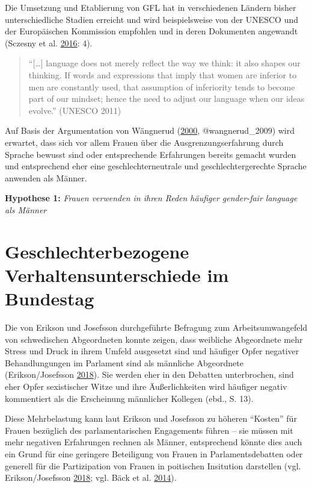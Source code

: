 \documentclass[12pt,ngerman,]{article}
\begin{document}
Die Umsetzung und Etablierung von GFL hat in verschiedenen Ländern
bisher unterschiedliche Stadien erreicht und wird beispielsweise von der
UNESCO und der Europäischen Kommission empfohlen und in deren Dokumenten
angewandt (Sczesny et al. \protect\hyperlink{ref-sczesny_2016}{2016}:
4).

\begin{quote}
\enquote{{[}\ldots{}{]} language does not merely reflect the way we
think: it also shapes our thinking. If words and expressions that imply
that women are inferior to men are constantly used, that assumption of
inferiority tends to become part of our mindset; hence the need to
adjust our language when our ideas evolve.} (UNESCO 2011)
\end{quote}

Auf Basis der Argumentation von Wängnerud
(\protect\hyperlink{ref-wangnerud_2000}{2000}, @wangnerud\_2009) wird
erwartet, dass sich vor allem Frauen über die Ausgrenzungserfahrung
durch Sprache bewusst sind oder entsprechende Erfahrungen bereits
gemacht wurden und entsprechend eher eine geschlechterneutrale und
geschlechtergerechte Sprache anwenden als Männer.

\textbf{Hypothese 1:} \emph{Frauen verwenden in ihren Reden häufiger
gender-fair language als Männer}

\hypertarget{geschlechterbezogene-verhaltensunterschiede-im-bundestag}{%
\section{Geschlechterbezogene Verhaltensunterschiede im
Bundestag}\label{geschlechterbezogene-verhaltensunterschiede-im-bundestag}}

Die von Erikson und Josefsson durchgeführte Befragung zum
Arbeitsumwangefeld von schwedischen Abgeordneten konnte zeigen, dass
weibliche Abgeordnete mehr Stress und Druck in ihrem Umfeld ausgesetzt
sind und häufiger Opfer negativer Behandlungungen im Parlament sind als
männliche Abgeordnete (Erikson/Josefsson
\protect\hyperlink{ref-erikson_2018}{2018}). Sie werden eher in den
Debatten unterbrochen, sind eher Opfer sexistischer Witze und ihre
Äußerlichkeiten wird häufiger negativ kommentiert als die Erscheinung
männlicher Kollegen (ebd., S. 13).

Diese Mehrbelastung kann laut Erikson und Josefsson zu höheren
\enquote{Kosten} für Frauen bezüglich des parlamentarischen Engagements
führen -- sie müssen mit mehr negativen Erfahrungen rechnen als Männer,
entsprechend könnte dies auch ein Grund für eine geringere Beteiligung
von Frauen in Parlamentsdebatten oder generell für die Partizipation von
Frauen in poitischen Insitution darstellen (vgl. Erikson/Josefsson
\protect\hyperlink{ref-erikson_2018}{2018}; vgl. Bäck et al.
\protect\hyperlink{ref-back_2014}{2014}).
\end{document}
